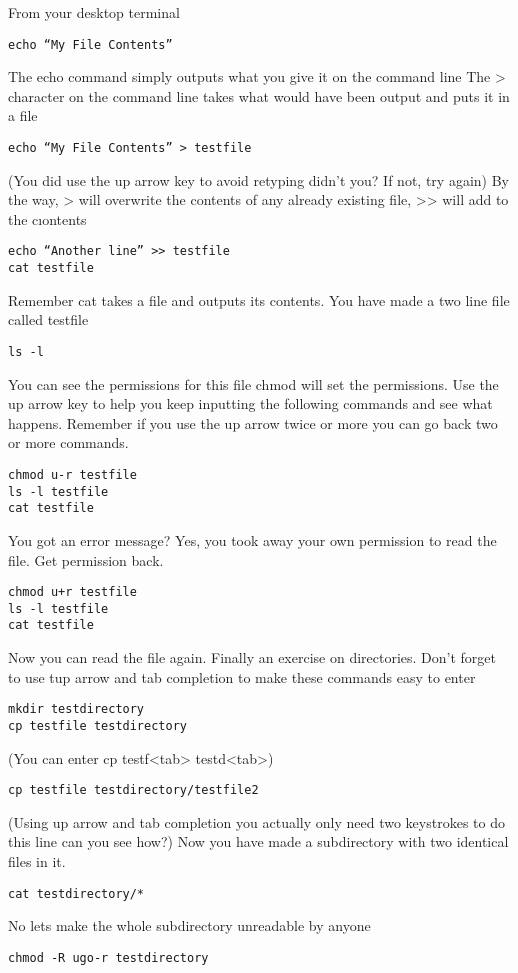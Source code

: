 \documentclass[12pt, a4paper]{article}
\begin{document}
From your desktop terminal
\begin{verbatim}
echo “My File Contents” 
\end{verbatim}
The echo command simply outputs what you give it on the command line
The > character on the command line takes what would have been output and puts it in a file
\begin{verbatim}
echo “My File Contents” > testfile 
\end{verbatim}
(You did use the up arrow key to avoid retyping didn’t you? If not, try again)
By the way, > will overwrite the contents of any already existing file, >> will add to the cıontents
\begin{verbatim}
echo “Another line” >> testfile
cat testfile
\end{verbatim}
Remember cat takes a file and outputs its contents.
You have made a two line file called testfile
\begin{verbatim}
ls -l
\end{verbatim}
You can see the permissions for this file
chmod will set the permissions. Use the up arrow key to help you keep inputting the following commands and see what happens. Remember if you use the up arrow twice or more you can go back two or more commands.
\begin{verbatim}
chmod u-r testfile
ls -l testfile
cat testfile
\end{verbatim}
You got an error message? Yes, you took away your own permission to read the file.
Get permission back.
\begin{verbatim}
chmod u+r testfile
ls -l testfile
cat testfile
\end{verbatim}
Now you can read the file again.
Finally an exercise on directories. Don’t forget to use tup arrow and tab completion to make these commands easy to enter
\begin{verbatim}
mkdir testdirectory
cp testfile testdirectory 
\end{verbatim}
(You can enter cp testf<tab> testd<tab>)
\begin{verbatim}
cp testfile testdirectory/testfile2
\end{verbatim}
(Using up arrow and tab completion you actually only need two keystrokes to do this line can you see how?)
Now you have made a subdirectory with two identical files in it.
\begin{verbatim}
cat testdirectory/*
\end{verbatim}
No lets make the whole subdirectory unreadable by anyone
\begin{verbatim}
chmod -R ugo-r testdirectory
\end{verbatim}
\end{document}
